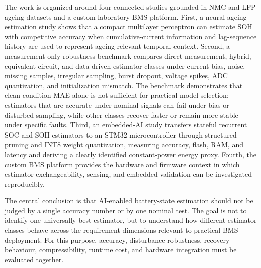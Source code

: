 \documentclass[
    a4paper,
    12pt,
    titlepage,
    bibliography=totoc,
    twoside=on,
    parskip=false,
    numbers=noenddot,
    cleardoublepage=empty,
    DIV=12,
    BCOR=12.0mm,
    headheight=36pt,
    headings=openright
]{scrreprt}
\begin{document}
The work is organized around four connected studies grounded in NMC and LFP ageing datasets and a custom laboratory BMS platform. First, a neural ageing-estimation study shows that a compact multilayer perceptron can estimate SOH with competitive accuracy when cumulative-current information and lag-sequence history are used to represent ageing-relevant temporal context. Second, a measurement-only robustness benchmark compares direct-measurement, hybrid, equivalent-circuit, and data-driven estimator classes under current bias, noise, missing samples, irregular sampling, burst dropout, voltage spikes, ADC quantization, and initialization mismatch. The benchmark demonstrates that clean-condition MAE alone is not sufficient for practical model selection: estimators that are accurate under nominal signals can fail under bias or disturbed sampling, while other classes recover faster or remain more stable under specific faults. Third, an embedded-AI study transfers stateful recurrent SOC and SOH estimators to an STM32 microcontroller through structured pruning and INT8 weight quantization, measuring accuracy, flash, RAM, and latency and deriving a clearly identified constant-power energy proxy. Fourth, the custom BMS platform provides the hardware and firmware context in which estimator exchangeability, sensing, and embedded validation can be investigated reproducibly.

The central conclusion is that AI-enabled battery-state estimation should not be judged by a single accuracy number or by one nominal test. The goal is not to identify one universally best estimator, but to understand how different estimator classes behave across the requirement dimensions relevant to practical BMS deployment. For this purpose, accuracy, disturbance robustness, recovery behaviour, compressibility, runtime cost, and hardware integration must be evaluated together.

\tableofcontents
\cleardoublepage
\end{document}

